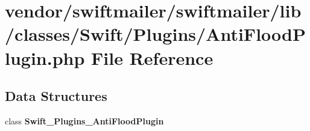 \section{vendor/swiftmailer/swiftmailer/lib/classes/\+Swift/\+Plugins/\+Anti\+Flood\+Plugin.php File Reference}
\label{_anti_flood_plugin_8php}
\subsection*{Data Structures}
\begin{DoxyCompactItemize}
\item 
class {\bf Swift\+\_\+\+Plugins\+\_\+\+Anti\+Flood\+Plugin}
\end{DoxyCompactItemize}
